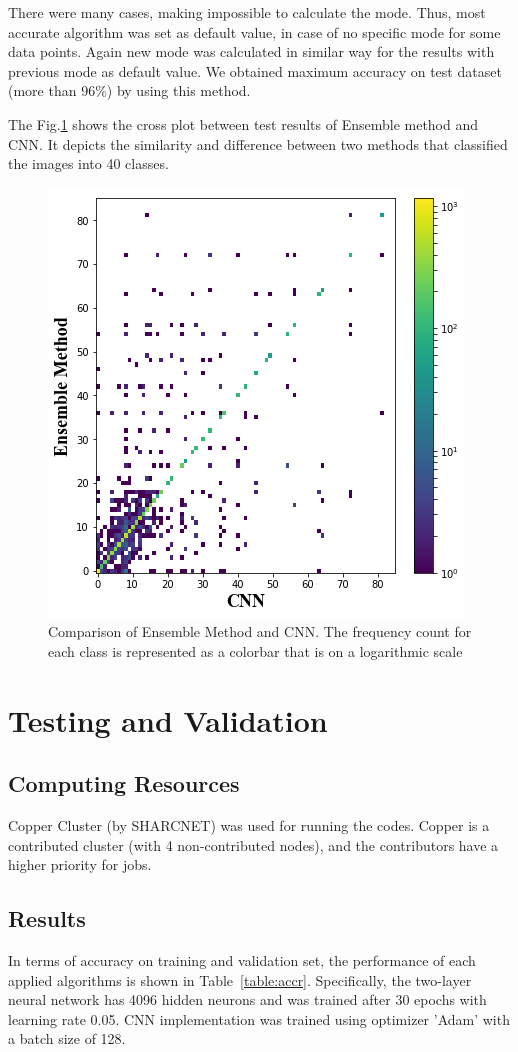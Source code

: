 \documentclass[10pt,conference]{IEEEtran}
\begin{document}
There were many cases, making impossible to calculate the mode. Thus, most accurate algorithm was set as default value, in case of no specific mode for some data points. Again new mode was calculated in similar way for the results with previous mode as default value. We obtained maximum accuracy on test dataset (more than 96\%) by using this method.

The Fig.\ref{fig:cross} shows the cross plot between test results of Ensemble method and CNN. It depicts the similarity and difference between two methods that classified the images into 40 classes.

\begin{figure}[!tbhp]
\centering
\includegraphics[width = 0.6\linewidth]{histo.png}
\caption{Comparison of Ensemble Method and CNN. The frequency count for each class is represented as a colorbar that is on a logarithmic scale}
\label{fig:cross}
\end{figure}

\section{Testing and Validation}
\subsection{Computing Resources}
Copper Cluster (by SHARCNET) was used for running the codes. Copper is a contributed cluster (with 4 non-contributed nodes), and the contributors have a higher priority for jobs.

\subsection{Results}
In terms of accuracy on training and validation set, the performance of each applied algorithms is shown in Table~\ref{table:accr}. Specifically, the two-layer neural network has 4096 hidden neurons and was trained after 30 epochs with learning rate 0.05. CNN implementation was trained using optimizer 'Adam'\cite{kingma2014adam} with a batch size of 128. 
\end{document}
